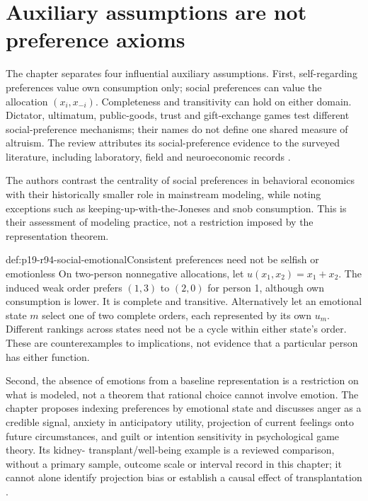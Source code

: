\section{Auxiliary assumptions are not preference axioms}
\label{sec:p19-r94-auxiliary}

The chapter separates four influential auxiliary assumptions. First,
self-regarding preferences value own consumption only; social preferences
can value the allocation \((x_i,x_{-i})\). Completeness and transitivity
can hold on either domain. Dictator, ultimatum, public-goods, trust and
gift-exchange games test different social-preference mechanisms; their
names do not define one shared measure of altruism. The review attributes
its social-preference evidence to the surveyed literature, including
laboratory, field and neuroeconomic records
\cite[p.~568, note~3]{DhamiAlNowaihi2021Economics}.

The authors contrast the centrality of social preferences in behavioral
economics with their historically smaller role in mainstream modeling,
while noting exceptions such as keeping-up-with-the-Joneses and snob
consumption. This is their assessment of modeling practice, not a
restriction imposed by the representation theorem.

\begin{hbexample}{def:p19-r94-social-emotional}{Consistent preferences need not be selfish or emotionless}
On two-person nonnegative allocations, let \(u(x_1,x_2)=x_1+x_2\).
The induced weak order prefers \((1,3)\) to \((2,0)\) for person 1,
although own consumption is lower. It is complete and transitive.
Alternatively let an emotional state \(m\) select one of two complete
orders, each represented by its own \(u_m\). Different rankings across
states need not be a cycle within either state's order. These are
counterexamples to implications, not evidence that a particular person
has either function.
\end{hbexample}

Second, the absence of emotions from a baseline representation is a
restriction on what is modeled, not a theorem that rational choice cannot
involve emotion. The chapter proposes indexing preferences by emotional
state and discusses anger as a credible signal, anxiety in anticipatory
utility, projection of current feelings onto future circumstances, and
guilt or intention sensitivity in psychological game theory. Its kidney-
transplant/well-being example is a reviewed comparison, without a primary
sample, outcome scale or interval record in this chapter; it cannot alone
identify projection bias or establish a causal effect of transplantation
\cite[p.~568]{DhamiAlNowaihi2021Economics}.

